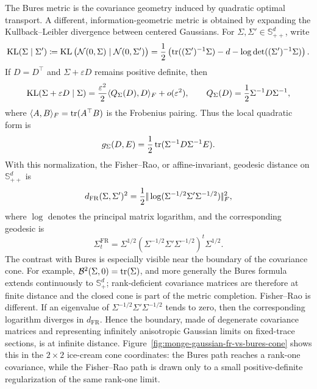 \begin{rem}\label{rem-fisher-rao-bures-gaussian}
	The Bures metric is the covariance geometry induced by quadratic optimal transport. A different, information-geometric metric is obtained by expanding the Kullback--Leibler divergence between centered Gaussians. For $\Sigma,\Sigma'\in\mathbb S_{++}^d$, write
	\[
		\operatorname{KL}(\Sigma\mid\Sigma')
		\coloneqq
		\operatorname{KL}\big(\mathcal{N}(0,\Sigma)\mid\mathcal{N}(0,\Sigma')\big)
		=
		\frac12\left(
		\operatorname{tr}((\Sigma')^{-1}\Sigma)-d-\log\det((\Sigma')^{-1}\Sigma)
		\right).
	\]
	If $D=D^\top$ and $\Sigma+\varepsilon D$ remains positive definite, then
	\[
		\operatorname{KL}(\Sigma+\varepsilon D\mid\Sigma)
		=
		\frac{\varepsilon^2}{2}\langle Q_\Sigma(D),D\rangle_F+o(\varepsilon^2),
		\qquad
		Q_\Sigma(D)=\frac12\Sigma^{-1}D\Sigma^{-1},
	\]
	where $\langle A,B\rangle_F=\operatorname{tr}(A^\top B)$ is the Frobenius pairing. Thus the local quadratic form is
	\[
		g_\Sigma(D,E)=\frac12\operatorname{tr}(\Sigma^{-1}D\Sigma^{-1}E).
	\]
	With this normalization, the Fisher--Rao, or affine-invariant, geodesic distance on $\mathbb S_{++}^d$ is
	\[
		d_{\mathrm{FR}}(\Sigma,\Sigma')^2
		=
		\frac12
		|\!| \log(\Sigma^{-1/2}\Sigma'\Sigma^{-1/2}) |\!|_F^2,
	\]
	where $\log$ denotes the principal matrix logarithm, and the corresponding geodesic is
	\[
		\Sigma_t^{\mathrm{FR}}
		=
		\Sigma^{1/2}
		\left(\Sigma^{-1/2}\Sigma'\Sigma^{-1/2}\right)^t
		\Sigma^{1/2}.
	\]
	The contrast with Bures is especially visible near the boundary of the covariance cone. For example, $\mathcal{B}^2(\Sigma,0)=\operatorname{tr}(\Sigma)$, and more generally the Bures formula extends continuously to $\mathbb S_+^d$; rank-deficient covariance matrices are therefore at finite distance and the closed cone is part of the metric completion. Fisher--Rao is different. If an eigenvalue of $\Sigma^{-1/2}\Sigma'\Sigma^{-1/2}$ tends to zero, then the corresponding logarithm diverges in $d_{\mathrm{FR}}$. Hence the boundary, made of degenerate covariance matrices and representing infinitely anisotropic Gaussian limits on fixed-trace sections, is at infinite distance. Figure~\ref{fig:monge-gaussian-fr-vs-bures-cone} shows this in the $2\times2$ ice-cream cone coordinates: the Bures path reaches a rank-one covariance, while the Fisher--Rao path is drawn only to a small positive-definite regularization of the same rank-one limit.
\end{rem}

